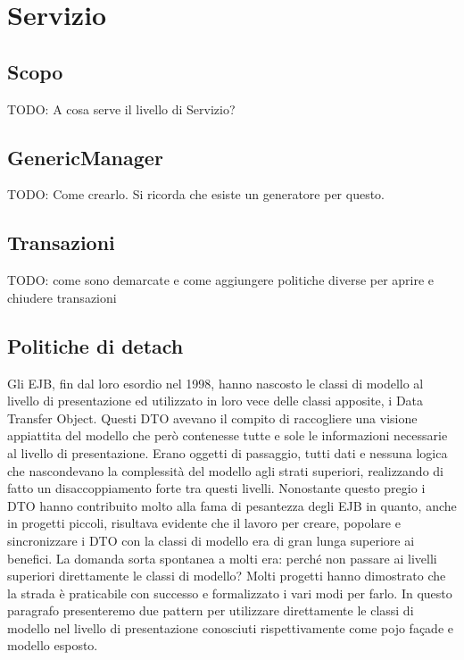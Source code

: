 \chapter{Servizio}

\section{Scopo}
TODO: A cosa serve il livello di Servizio? \cite{spring}

\section{GenericManager}
TODO: Come crearlo. Si ricorda che esiste un generatore per questo.

\section{Transazioni}
TODO: come sono demarcate e come aggiungere politiche diverse per aprire e chiudere transazioni

\section{Politiche di detach}
Gli EJB, fin dal loro esordio nel 1998, hanno nascosto le classi di modello al livello di presentazione ed utilizzato in loro vece delle classi apposite, i Data Transfer Object. Questi DTO avevano il compito di raccogliere una visione appiattita del modello che però contenesse tutte e sole le informazioni necessarie al livello di presentazione. Erano oggetti di passaggio, tutti dati e nessuna logica che nascondevano la complessità del modello agli strati superiori, realizzando di fatto un disaccoppiamento forte tra questi livelli. 
Nonostante questo pregio i DTO hanno contribuito molto alla fama di pesantezza degli EJB in quanto, anche in progetti piccoli, risultava evidente che il lavoro per creare, popolare e sincronizzare i DTO con la classi di modello era di gran lunga superiore ai benefici. La domanda sorta spontanea a molti era: perché non passare ai livelli superiori direttamente le classi di modello? Molti progetti hanno dimostrato che la strada è praticabile con successo e formalizzato i vari modi per farlo.
In questo paragrafo presenteremo due pattern per utilizzare direttamente le classi di modello nel livello di presentazione conosciuti rispettivamente come pojo façade e modello  esposto.

